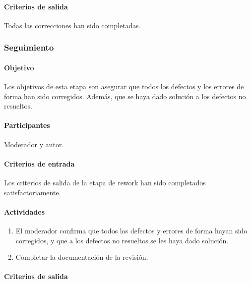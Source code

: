 \paragraph{Criterios de salida\\}

Todas las correcciones han sido completadas. 

\subsubsection{Seguimiento}

\paragraph{Objetivo\\}

Los objetivos de esta etapa son asegurar que todos los defectos y los errores de forma han sido corregidos. Además, que se haya dado solución a los defectos no resueltos.

\paragraph{Participantes\\}

Moderador y autor.

\paragraph{Criterios de entrada\\}

Los criterios de salida de la etapa de rework han sido completados satisfactoriamente.

\paragraph{Actividades}

\begin{enumerate}
	\item
		El moderador confirma que todos los defectos y errores de forma hayan sido corregidos, y que a los defectos no resueltos se les haya dado solución.
	\item
		Completar la documentación de la revisión.
\end{enumerate}

\paragraph{Criterios de salida}

